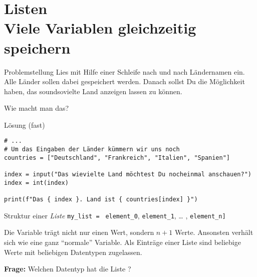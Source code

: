 \section{Listen \\ \footnotesize Viele Variablen gleichzeitig speichern}


\begin{frame}
\begin{block}{Problemstellung}
\vspace{2pt}
Lies mit Hilfe einer Schleife nach und nach Ländernamen ein. 
Alle Länder sollen dabei gespeichert werden. Danach sollst Du die Möglichkeit haben, das soundsovielte Land anzeigen lassen zu können.   

\vspace{8pt}

Wie macht man das? 
\end{block}
\end{frame}

\begin{fragile}{}
\begin{block}{Lösung \footnotesize(fast)}
\begin{verbatim}
# ...
# Um das Eingaben der Länder kümmern wir uns noch 
countries = ["Deutschland", "Frankreich", "Italien", "Spanien"] 

index = input("Das wievielte Land möchtest Du nocheinmal anschauen?")
index = int(index)

print(f"Das { index }. Land ist { countries[index] }")
\end{verbatim}
\end{block}
\end{fragile}


\begin{fragile}

\begin{block}{Struktur einer \emph{Liste}}
\vspace{2pt}
\large
\texttt{my\_list = }\pause {\Large\texttt{[}}\pause 
\texttt{element\_0}\pause,
\pause 
\texttt{element\_1}, \pause 
 \dots   
, \texttt{element\_n}\pause \Large{\texttt{]}}
\end{block}

\pause 

Die Variable  trägt nicht nur einen Wert, sondern $n+1$ Werte. Ansonsten verhält sich  wie eine ganz \enquote{normale} Variable. 
Als Einträge einer Liste sind beliebige Werte mit beliebigen Datentypen zugelassen. 


\vspace{12pt}

\pause

\textbf{Frage:} Welchen Datentyp hat die Liste \py{[2, 2.3, "Hello"]} ? 
	
\end{fragile}

